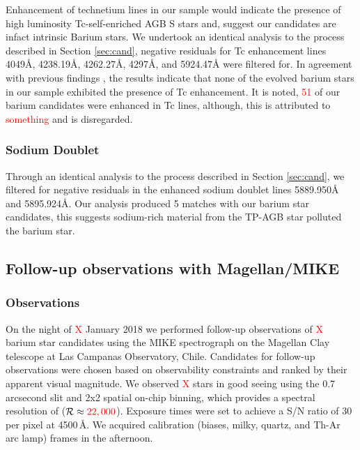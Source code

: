 \documentclass[a4paper,fleqn,usenatbib]{mnras}
\newcommand{\todo}[1]{\textcolor{red}{#1}}
\begin{document}
Enhancement of technetium lines in our sample would indicate the presence of high luminosity Tc-self-enriched AGB S stars \citep{jorissen1993} and, suggest our candidates are infact intrinsic Barium stars. We undertook an identical analysis to the process described in Section \ref{sec:cand}, negative residuals for Tc enhancement lines 4049\AA, 4238.19\AA, 4262.27\AA, 4297\AA, and 5924.47\AA\hspace{0.2mm} were filtered for. In agreement with previous findings \citep[e.g.][]{little1987,smith1984,smith1983}, the results indicate that none of the evolved barium stars in our sample exhibited the presence of Tc enhancement. It is noted, \todo{51} of our barium candidates were enhanced in Tc lines, although, this is attributed to \todo{something} and is disregarded.


\subsubsection{Sodium Doublet}

Through an identical analysis to the process described in Section \ref{sec:cand}, we filtered for negative residuals in the enhanced sodium doublet lines 5889.950\AA\hspace{0.2mm} and 5895.924\AA. Our analysis produced 5 matches with our barium star candidates, this suggests sodium-rich material from the TP-AGB star polluted the barium star. 

\subsection{Follow-up observations with Magellan/MIKE}

\subsubsection{Observations}
On the night of \todo{X} January 2018 we performed follow-up observations of \todo{X} barium star candidates using the MIKE spectrograph on the Magellan Clay telescope at Las Campanas Observatory, Chile. Candidates for follow-up observations were chosen based on observability constraints and ranked by their apparent visual magnitude. We observed \todo{X} stars in good seeing using the 0.7 arcsecond slit and 2x2 spatial on-chip binning, which provides a spectral resolution of ($\mathcal{R} \approx \todo{22,000}$). Exposure times were set to achieve a S/N ratio of 30 per pixel at 4500\,\AA. We acquired calibration (biases, milky, quartz, and Th-Ar arc lamp) frames in the afternoon.
\end{document}
